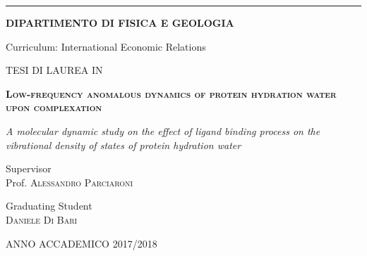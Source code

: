 \begin{titlepage}
\pagestyle{empty}


\begin{center}

\vspace*{1cm}

\hrule

\vspace*{1.25cm}
 
\begin{large}
\textbf{DIPARTIMENTO DI FISICA E GEOLOGIA}
\end{large}

\vspace*{2cm}  

\begin{large}
Curriculum: International Economic Relations
\end{large}

\vspace*{2cm}

\begin{large}
TESI DI LAUREA IN 	
\end{large}

\vspace*{0.25cm}  

\begin{Large}
\textbf{\textsc{Low-frequency anomalous dynamics of protein hydration water upon complexation}}
\end{Large}

\vspace*{2cm}

\begin{large}
\textit{A molecular dynamic study on the effect of ligand binding process on the vibrational density of states of protein hydration water}
\end{large}

\vspace*{2.75cm}

\begin{minipage}{0.45\textwidth}
\begin{flushleft} 
Supervisor\\
Prof. \textsc{Alessandro Parciaroni}
\end{flushleft}
\end{minipage}
\hfill
\begin{minipage}{0.5\textwidth}
\begin{flushright} 
Graduating Student\\
\textsc{Daniele Di Bari}
\end{flushright}
\end{minipage}

\vspace*{1.5cm}

ANNO ACCADEMICO 2017/2018

\end{center}
\cleardoublepage
\end{titlepage}

